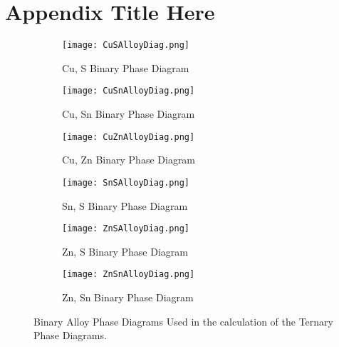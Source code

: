
\chapter{Appendix Title Here} %

\label{AppendixA} %


\begin{figure}[t]
\centering
\begin{subfigure}{70mm}
  \centering
    \texttt{[image: CuSAlloyDiag.png]}
    \caption{Cu, S Binary Phase Diagram\citep{Hay2000}}
    \label{fig:CuS}
\end{subfigure}%
\begin{subfigure}{70mm}
 \centering
    \texttt{[image: CuSnAlloyDiag.png]}
    \caption{Cu, Sn Binary Phase Diagram\citep{Hay2000}}
    \label{fig:CuSn}
\end{subfigure}
\begin{subfigure}{70mm}
 \centering
    \texttt{[image: CuZnAlloyDiag.png]}
    \caption{Cu, Zn Binary Phase Diagram\citep{Hay2000}}
    \label{fig:CuZn}
\end{subfigure}
\begin{subfigure}{70mm}
 \centering
    \texttt{[image: SnSAlloyDiag.png]}
    \caption{Sn, S Binary Phase Diagram\citep{Hay2000}}
    \label{fig:SnS}
\end{subfigure}
\begin{subfigure}{70mm}
 \centering
    \texttt{[image: ZnSAlloyDiag.png]}
    \caption{Zn, S Binary Phase Diagram\citep{Sharma1996}}
    \label{fig:ZnS}
\end{subfigure}
\begin{subfigure}{70mm}
 \centering
    \texttt{[image: ZnSnAlloyDiag.png]}
    \caption{Zn, Sn Binary Phase Diagram\citep{Hay2000}}
    \label{fig:ZnSn}
\end{subfigure}
\caption{Binary Alloy Phase Diagrams Used in the calculation of the Ternary Phase Diagrams.}
\label{fig:BinaryAlloyPhaseDiagrams}
\end{figure}
